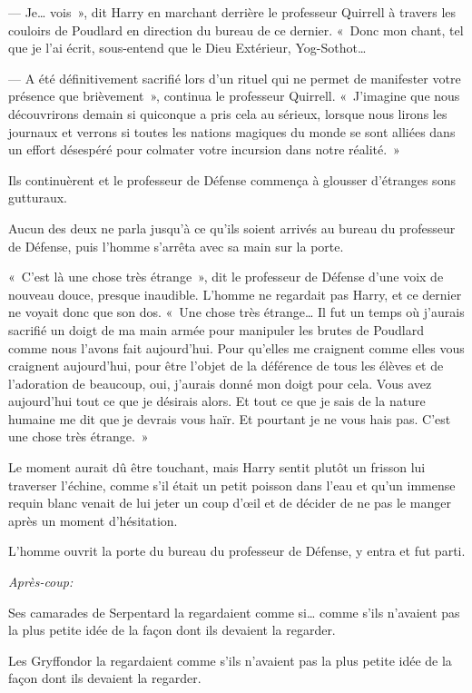 --- Je… vois~», dit Harry en marchant derrière le professeur Quirrell à travers les couloirs de Poudlard en direction du bureau de ce dernier.
«~Donc mon chant, tel que je l'ai écrit, sous-entend que le Dieu Extérieur, Yog-Sothot…

--- A été définitivement sacrifié lors d'un rituel qui ne permet de manifester votre présence que brièvement~», continua le professeur Quirrell.
«~J'imagine que nous découvrirons demain si quiconque a pris cela au sérieux, lorsque nous lirons les journaux et verrons si toutes les nations magiques du monde se sont alliées dans un effort désespéré pour colmater votre incursion dans notre réalité.~»

Ils continuèrent et le professeur de Défense commença à glousser d'étranges sons gutturaux.

Aucun des deux ne parla jusqu'à ce qu'ils soient arrivés au bureau du professeur de Défense, puis l'homme s'arrêta avec sa main sur la porte.

«~C'est là une chose très étrange~», dit le professeur de Défense d'une voix de nouveau douce, presque inaudible.
L'homme ne regardait pas Harry, et ce dernier ne voyait donc que son dos.
«~Une chose très étrange…
Il fut un temps où j'aurais sacrifié un doigt de ma main armée pour manipuler les brutes de Poudlard comme nous l'avons fait aujourd'hui.
Pour qu'elles me craignent comme elles vous craignent aujourd'hui, pour être l'objet de la déférence de tous les élèves et de l'adoration de beaucoup, oui, j'aurais donné mon doigt pour cela.
Vous avez aujourd'hui tout ce que je désirais alors.
Et tout ce que je sais de la nature humaine me dit que je devrais vous haïr.
Et pourtant je ne vous hais pas.
C'est une chose très étrange.~»

Le moment aurait dû être touchant, mais Harry sentit plutôt un frisson lui traverser l'échine, comme s'il était un petit poisson dans l'eau et qu'un immense requin blanc venait de lui jeter un coup d'œil et de décider de ne pas le manger après un moment d'hésitation.

L'homme ouvrit la porte du bureau du professeur de Défense, y entra et fut parti.

\later

\emph{Après-coup:}

Ses camarades de Serpentard la regardaient comme si… comme s'ils n'avaient pas la plus petite idée de la façon dont ils devaient la regarder.

Les Gryffondor la regardaient comme s'ils n'avaient pas la plus petite idée de la façon dont ils devaient la regarder.

